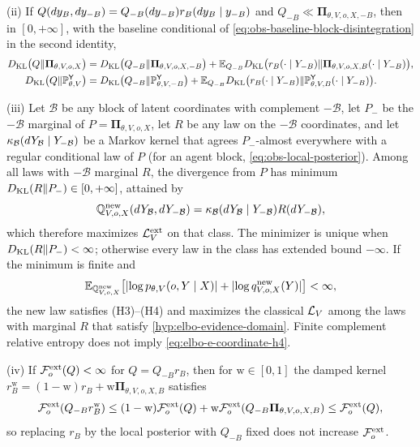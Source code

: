 (ii) If $Q(dy_B,dy_{-B})=Q_{-B}(dy_{-B})r_B(dy_B\mid y_{-B})$ and
$Q_{-B}\ll\boldsymbol\Pi_{\theta,V,o,X,-B}$, then in $[0,+\infty]$, with the
baseline conditional of \eqref{eq:obs-baseline-block-disintegration} in the
second identity,
\begin{align}
D_{\mathrm{KL}}\bigl(Q\Vert\boldsymbol\Pi_{\theta,V,o,X}\bigr)
&=D_{\mathrm{KL}}\bigl(Q_{-B}\Vert\boldsymbol\Pi_{\theta,V,o,X,-B}\bigr)
+\mathbb E_{Q_{-B}}D_{\mathrm{KL}}\bigl(r_B(\cdot\mid Y_{-B})\Vert\boldsymbol\Pi_{\theta,V,o,X,B}(\cdot\mid Y_{-B})\bigr),
\label{eq:obs-posterior-block-kl-chain}\\
D_{\mathrm{KL}}\bigl(Q\Vert\mathbb P^{\mathsf Y}_{\theta,V}\bigr)
&=D_{\mathrm{KL}}\bigl(Q_{-B}\Vert\mathbb P^{\mathsf Y}_{\theta,V,-B}\bigr)
+\mathbb E_{Q_{-B}}D_{\mathrm{KL}}\bigl(r_B(\cdot\mid Y_{-B})\Vert\mathbb P^{\mathsf Y}_{\theta,V,B}(\cdot\mid Y_{-B})\bigr).
\label{eq:obs-block-kl-chain}
\end{align}

(iii) Let $\mathcal B$ be any block of latent coordinates with complement
$-\mathcal B$, let $P_-$ be the $-\mathcal B$ marginal of
$P=\boldsymbol\Pi_{\theta,V,o,X}$, let $R$ be any law on the $-\mathcal B$
coordinates, and let $\kappa_{\mathcal B}(dY_{\mathcal B}\mid Y_{-\mathcal B})$
be a Markov kernel that agrees $P_-$-almost everywhere with a regular
conditional law of $P$ (for an agent block, \eqref{eq:obs-local-posterior}).
Among all laws with $-\mathcal B$ marginal $R$, the divergence from $P$ has
minimum $D_{\mathrm{KL}}(R\Vert P_-)\in[0,+\infty]$, attained by
\begin{equation}
\mathbb Q^{\mathrm{new}}_{V,o,X}(dY_{\mathcal B},dY_{-\mathcal B})
=\kappa_{\mathcal B}(dY_{\mathcal B}\mid Y_{-\mathcal B})R(dY_{-\mathcal B}),
\label{eq:elbo-e-coordinate}
\end{equation}
which therefore maximizes $\mathcal L_V^{\mathrm{ext}}$ on that class. The minimizer
is unique when $D_{\mathrm{KL}}(R\Vert P_-)<\infty$; otherwise every law in the class has
extended bound $-\infty$. If the minimum is finite and
\begin{equation}
\mathbb E_{\mathbb Q^{\mathrm{new}}_{V,o,X}}\bigl[\lvert\log p_{\theta,V}(o,Y\mid X)\rvert
+\lvert\log q^{\mathrm{new}}_{V,o,X}(Y)\rvert\bigr]<\infty,
\label{eq:elbo-e-coordinate-h4}
\end{equation}
the new law satisfies (H3)--(H4) and maximizes the classical $\mathcal L_V$ among
the laws with marginal $R$ that satisfy \cref{hyp:elbo-evidence-domain}.
Finite complement relative entropy does not imply \eqref{eq:elbo-e-coordinate-h4}.

(iv) If $\mathcal F^{\mathrm{ext}}_o(Q)<\infty$ for $Q=Q_{-B}r_B$, then for
$\mathrm w\in[0,1]$ the damped kernel
$r_B^{\mathrm w}=(1-\mathrm w)r_B+\mathrm w\boldsymbol\Pi_{\theta,V,o,X,B}$
satisfies
\begin{equation}
\mathcal F^{\mathrm{ext}}_o(Q_{-B}r_B^{\mathrm w})
\leq(1-\mathrm w)\mathcal F^{\mathrm{ext}}_o(Q)
+\mathrm w\mathcal F^{\mathrm{ext}}_o(Q_{-B}\boldsymbol\Pi_{\theta,V,o,X,B})
\leq\mathcal F^{\mathrm{ext}}_o(Q),
\label{eq:obs-damped-block-update}
\end{equation}
so replacing $r_B$ by the local posterior with $Q_{-B}$ fixed does not increase
$\mathcal F^{\mathrm{ext}}_o$. 

